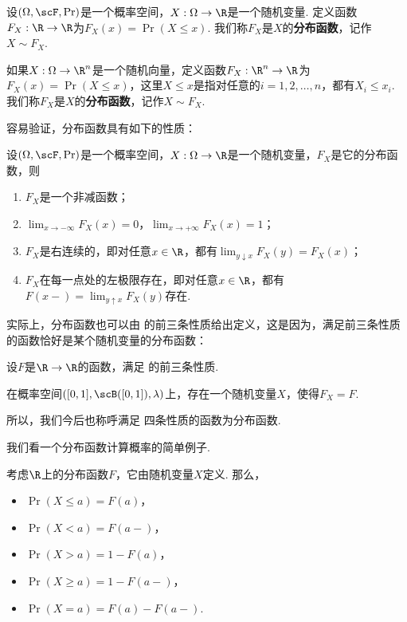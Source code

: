 \begin{definition}[分布函数]
设$(\Omega,\scF,\Pr)$是一个概率空间，$X:\Omega\to\R$是一个随机变量. 定义函数$F_X:\R\to\R$为$F_X(x) = \Pr(X\leq x)$. 我们称$F_X$是$X$的\textbf{分布函数}，记作$X\sim F_X$.

如果$X:\Omega\to\R^n$是一个随机向量，定义函数$F_X:\R^n\to\R$为$F_X(x) = \Pr(X\leq x)$，这里$X\leq x$是指对任意的$i=1,2,\ldots,n$，都有$X_i\leq x_i$. 我们称$F_X$是$X$的\textbf{分布函数}，记作$X\sim F_X$.
\end{definition}

容易验证，分布函数具有如下的性质：

\begin{proposition}\label{prop:distribution-function}
设$(\Omega,\scF,\Pr)$是一个概率空间，$X:\Omega\to\R$是一个随机变量，$F_X$是它的分布函数，则
\begin{enumerate}
    \item $F_X$是一个非减函数；
    \item $\lim_{x\to-\infty}F_X(x)=0$，$\lim_{x\to+\infty}F_X(x)=1$；
    \item $F_X$是右连续的，即对任意$x\in\R$，都有$\lim_{y\downarrow x}F_X(y)=F_X(x)$；
    \item $F_X$在每一点处的左极限存在，即对任意$x\in\R$，都有$F(x-)=\lim_{y\uparrow x}F_X(y)$存在.
\end{enumerate}
\end{proposition}

实际上，分布函数也可以由 的前三条性质给出定义，这是因为，满足前三条性质的函数恰好是某个随机变量的分布函数：

\begin{theorem}\label{thm:distribution-function}
设$F$是$\R\to\R$的函数，满足 的前三条性质. 

在概率空间$([0,1],\scB([0,1]),\lambda)$上，存在一个随机变量$X$，使得$F_X=F$.
\end{theorem}

所以，我们今后也称呼满足 四条性质的函数为分布函数. 

我们看一个分布函数计算概率的简单例子. 
\begin{example}\label{ex:distribution-prob}
    考虑$\R$上的分布函数$F$，它由随机变量$X$定义. 那么，
    \begin{itemize}
        \item $\Pr(X\leq a)=F(a)$，
        \item $\Pr(X<a)=F(a-)$，
        \item $\Pr(X>a)=1-F(a)$，
        \item $\Pr(X\geq a)=1-F(a-)$，
        \item $\Pr(X=a)=F(a)-F(a-)$. 
    \end{itemize}
    \end{example}

